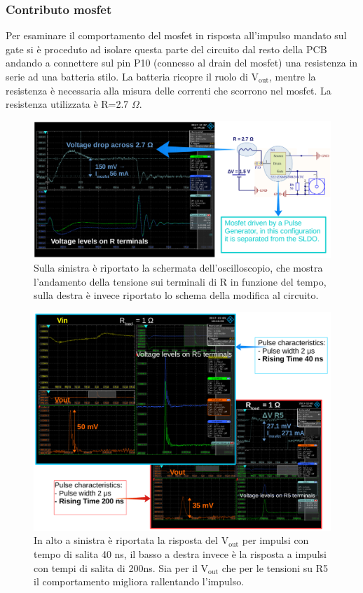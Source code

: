 \subsubsection{Contributo mosfet}
Per esaminare il comportamento del mosfet in risposta all'impulso mandato sul gate si è proceduto ad isolare questa parte del circuito dal resto della PCB andando a connettere sul pin P10 (connesso al drain del mosfet) una resistenza in serie ad una batteria stilo. La batteria ricopre il ruolo di $\mathrm{V_{out}}$, mentre la resistenza è necessaria alla misura delle correnti che scorrono nel mosfet. La resistenza utilizzata è R=2.7 $\Omega$. 

\begin{figure}
\centering
\includegraphics[scale=.3]{Immagini/MosfetBehaviour}
\caption{Sulla sinistra è riportato la schermata dell'oscilloscopio, che mostra l'andamento della tensione sui terminali di R in funzione del tempo, sulla destra è invece riportato lo schema della modifica al circuito.}
\label{MosfetBehaviour}
\end{figure}

\begin{figure}
\centering
\includegraphics[scale=.3]{Immagini/RiseTime}
\caption{In alto a sinistra è riportata la risposta del $\mathrm{V_{out}}$ per impulsi con tempo di salita 40 ns, il basso a destra invece è la risposta a impulsi con tempi di salita di 200ns. Sia per il $\mathrm{V_{out}}$ che per le tensioni su R5 il comportamento migliora rallentando l'impulso.}
\label{RiseTime}
\end{figure}

